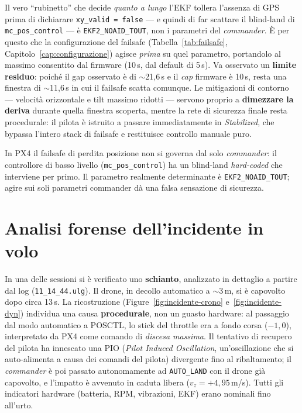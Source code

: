 Il vero \enquote{rubinetto} che decide \emph{quanto a lungo} l'EKF tollera
l'assenza di GPS prima di dichiarare \texttt{xy\_valid\,=\,false} --- e quindi di
far scattare il blind-land di \texttt{mc\_pos\_control} --- \`e
\texttt{EKF2\_NOAID\_TOUT}, non i parametri del \emph{commander}. \`E per questo che
la configurazione del failsafe (Tabella~\ref{tab:failsafe},
Capitolo~\ref{cap:configurazione}) agisce \emph{prima} su quel parametro,
portandolo al massimo consentito dal firmware (10\,s, dal default di 5\,s). Va
osservato un \textbf{limite residuo}: poich\'e il gap osservato \`e di
$\sim$21{,}6\,s e il \emph{cap} firmware \`e 10\,s, resta una finestra di
$\sim$11{,}6\,s in cui il failsafe scatta comunque. Le mitigazioni di contorno
--- velocit\`a orizzontale e tilt massimo ridotti --- servono proprio a
\textbf{dimezzare la deriva} durante quella finestra scoperta, mentre la rete di
sicurezza finale resta procedurale: il pilota \`e istruito a passare
immediatamente in \emph{Stabilized}, che bypassa l'intero stack di failsafe e
restituisce controllo manuale puro.

\begin{notabox}
In PX4 il failsafe di perdita posizione non si governa dal solo
\emph{commander}: il controllore di basso livello (\texttt{mc\_pos\_control}) ha un
blind-land \emph{hard-coded} che interviene per primo. Il parametro realmente
determinante \`e \texttt{EKF2\_NOAID\_TOUT}; agire sui soli parametri commander
d\`a una falsa sensazione di sicurezza.
\end{notabox}

\section{Analisi forense dell'incidente in volo}

In una delle sessioni si \`e verificato uno \textbf{schianto}, analizzato in
dettaglio a partire dal log (\texttt{11\_14\_44.ulg}). Il drone, in decollo
automatico a $\sim$3\,m, si \`e capovolto dopo circa 13\,s. La ricostruzione
(Figure~\ref{fig:incidente-crono} e~\ref{fig:incidente-dyn}) individua una causa
\textbf{procedurale}, non un guasto hardware: al passaggio dal modo automatico a
POSCTL, lo stick del throttle era a fondo corsa ($-1{,}0$), interpretato da PX4
come comando di \emph{discesa massima}. Il tentativo di recupero del pilota ha
innescato una PIO (\emph{Pilot Induced Oscillation}, un'oscillazione che si
auto-alimenta a causa dei comandi del pilota) divergente fino al ribaltamento; il
\emph{commander} \`e poi passato autonomamente ad \texttt{AUTO\_LAND} con il drone
gi\`a capovolto, e l'impatto \`e avvenuto in caduta libera ($v_z = +4{,}95$\,m/s).
Tutti gli indicatori hardware (batteria, RPM, vibrazioni, EKF) erano nominali fino
all'urto.

